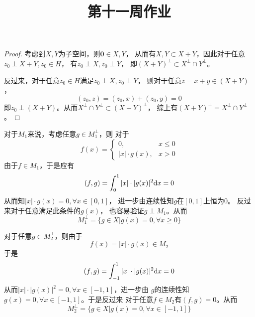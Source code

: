 \documentclass[cn]{homework}
\title{第十一周作业}
\begin{document}
    \maketitle

    \problem

    \problem
    \begin{proof}
        考虑到$X,Y$为子空间，则$\boldsymbol 0\in X,Y$，
        从而有$X,Y\subset X+Y$，因此对于任意$z_0\perp X+Y,z_0\in H$，
        有$z_0\perp X,z_0\perp Y$，
        即$(X+Y)^\perp\subset X^\perp\cap Y^\perp$。

        反过来，对于任意$z_0\in H$满足$z_0\perp X,z_0\perp Y$，
        则对于任意$z=x+y\in (X+Y)$，
        \[(z_0,z)=(z_0,x)+(z_0,y)=0\]
        即$z_0\perp (X+Y)$。从而$X^\perp\cap Y^\perp\subset (X+Y)^\perp$，
        综上有$(X+Y)^\perp=X^\perp\cap Y^\perp$。
    \end{proof}

    \problem

    \problem
    \newcommand{\cg}{\overline}
    对于$M_1$来说，考虑任意$g\in M_1^\perp$，则
    对于
    \[f(x)=\begin{cases}
        0,&x\leq 0\\
        |x|\cdot g(x),&x>0
    \end{cases}\]
    由于$f\in M_1$，于是应有
    \[(f,g)=\int_0^1|x|\cdot|g(x)|^2\mathrm d x=0\]
    从而知$|x|\cdot g(x)=0,\forall x\in[0,1]$，
    进一步由连续性知$g$在$[0,1]$上恒为$0$。
    反过来对于任意满足此条件的$g(x)$，
    也容易验证$g\perp M_1$。从而
    \[M_1^\perp=\{g\in X|g(x)=0,\forall x\geq 0\}\]

    对于任意$g\in M_2^\perp$，则由于
    \[f(x)=|x|\cdot g(x)\in M_2\]
    于是
    \[(f,g)=\int_{-1}^1|x|\cdot|g(x)|^2\mathrm d x=0\]
    从而$|x|\cdot |g(x)|^2=0,\forall x\in[-1,1]$，进一步由
    $g$的连续性知$g(x)=0,\forall x\in[-1,1]$。于是反过来
    对于任意$f\in M_2$有$(f,g)=0$。从而
    \[M_2^\perp=\{g\in X|g(x)=0,\forall x\in[-1,1]\}\]
\end{document}

